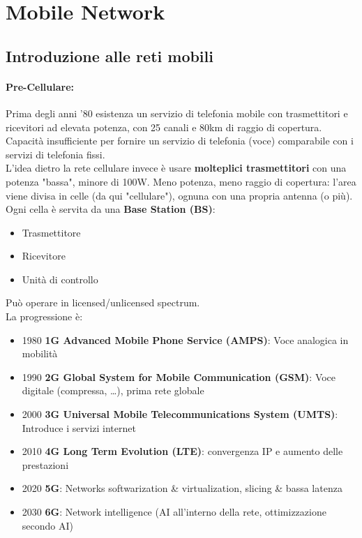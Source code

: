 \section{Mobile Network}

\subsection{Introduzione alle reti mobili}

\paragraph{Pre-Cellulare:} Prima degli anni '80 esistenza un servizio di telefonia mobile con trasmettitori e ricevitori ad elevata potenza, con 25 canali e 80km di raggio di copertura. Capacità insufficiente per fornire un servizio di telefonia (voce) comparabile con i servizi di telefonia fissi.\\

L'idea dietro la rete cellulare invece è usare \textbf{molteplici trasmettitori} con una potenza "bassa", minore di 100W. Meno potenza, meno raggio di copertura: l'area viene divisa in celle (da qui "cellulare"), ognuna con una propria antenna (o più).\\

Ogni cella è servita da una \textbf{Base Station (BS)}:
\begin{itemize}
	\item Trasmettitore
	\item Ricevitore
	\item Unità di controllo
\end{itemize}
Può operare in licensed/unlicensed spectrum.\\

La progressione è:
\begin{itemize}
	\item 1980 \textbf{1G Advanced Mobile Phone Service (AMPS)}: Voce analogica in mobilità
	\item 1990 \textbf{2G Global System for Mobile Communication (GSM)}: Voce digitale (compressa, \dots), prima rete globale
	\item 2000 \textbf{3G Universal Mobile Telecommunications System (UMTS)}: Introduce i servizi internet
	\item 2010 \textbf{4G Long Term Evolution (LTE)}: convergenza IP e aumento delle prestazioni
	\item 2020 \textbf{5G}: Networks softwarization \& virtualization, slicing \& bassa latenza
	\item 2030 \textbf{6G}: Network intelligence (AI all'interno della rete, ottimizzazione secondo AI)
\end{itemize}

